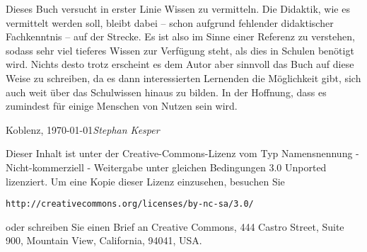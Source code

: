 Dieses Buch versucht in erster Linie Wissen zu vermitteln. Die Didaktik, wie es vermittelt werden soll, bleibt dabei -- schon aufgrund fehlender didaktischer Fachkenntnis -- auf der Strecke. Es ist also im Sinne einer Referenz zu verstehen, sodass sehr viel tieferes Wissen zur Verfügung steht, als dies in Schulen benötigt wird. Nichts desto trotz erscheint es dem Autor aber sinnvoll das Buch auf diese Weise zu schreiben, da es dann interessierten Lernenden die Möglichkeit gibt, sich auch weit über das Schulwissen hinaus zu bilden. In der Hoffnung, dass es zumindest für einige Menschen von Nutzen sein wird.


\vspace{\baselineskip}
\begin{flushright}\noindent
Koblenz, \today \hfill {\it Stephan Kesper}
\end{flushright}

\vfill

\noindent Dieser Inhalt ist unter der Creative-Commons-Lizenz vom Typ Namensnennung - Nicht-kommerziell - Weitergabe unter gleichen Bedingungen 3.0 Unported lizenziert. Um eine Kopie dieser Lizenz einzusehen, besuchen Sie

\bigskip
\begin{center}
\texttt{http://creativecommons.org/licenses/by-nc-sa/3.0/}
\end{center}

\bigskip

\noindent oder schreiben Sie einen Brief an Creative Commons, 444 Castro Street, Suite 900, Mountain View, California, 94041, USA.



